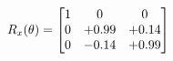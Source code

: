 \documentclass[preview]{standalone}
\begin{document}
\begin{align*}
\special{dvisvgm:raw <g id='unique000'>}R_{x}(\theta) = \begin{bmatrix}1 & 0 & 0 \\0 & +0.99 & +0.14 \\0 & -0.14 & +0.99\end{bmatrix}\special{dvisvgm:raw </g>}
\end{align*}
\end{document}
